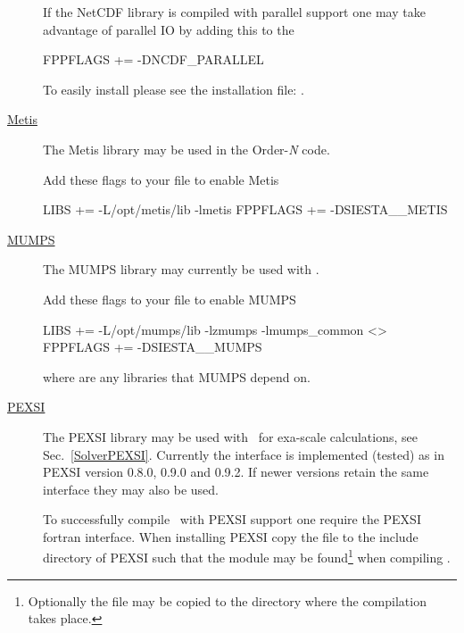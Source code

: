 \begin{description}
  
  If the NetCDF library is compiled with parallel support one may
  take advantage of parallel IO by adding this to the  
\begin{shellexample}
  FPPFLAGS += -DNCDF_PARALLEL
\end{shellexample}

  To easily install  please see the installation file:
  .


  \item[\href{http://glaros.dtc.umn.edu/gkhome/metis/metis/overview}{Metis}]%
  The Metis library may be used in the Order-\emph N code. 

  Add these flags to your  file to enable Metis
\begin{shellexample}
  LIBS += -L/opt/metis/lib -lmetis
  FPPFLAGS += -DSIESTA__METIS
\end{shellexample}


  \item[\href{http://mumps.enseeiht.fr}{MUMPS}]%
  The MUMPS library may currently be used with \tsiesta.
  
  Add these flags to your  file to enable MUMPS
\begin{shellexample}
  LIBS += -L/opt/mumps/lib -lzmumps -lmumps_common <>
  FPPFLAGS += -DSIESTA__MUMPS
\end{shellexample}
  where \shell{<>} are any libraries that MUMPS depend on.


  \item[\href{https://math.berkeley.edu/~linlin/pexsi}{PEXSI}]%
  The PEXSI library may be used with \siesta\ for exa-scale
  calculations, see Sec.~\ref{SolverPEXSI}. Currently the interface is
  implemented (tested) as in PEXSI version 0.8.0, 0.9.0 and 0.9.2. If
  newer versions retain the same interface they may also be used.

  To successfully compile \siesta\ with PEXSI support one require the
  PEXSI fortran interface. When installing PEXSI copy the
   file to the include directory of
  PEXSI such that the module may be found\footnote{Optionally the file
      may be copied to the  directory where the compilation
      takes place.} when compiling \siesta.


\end{description}
